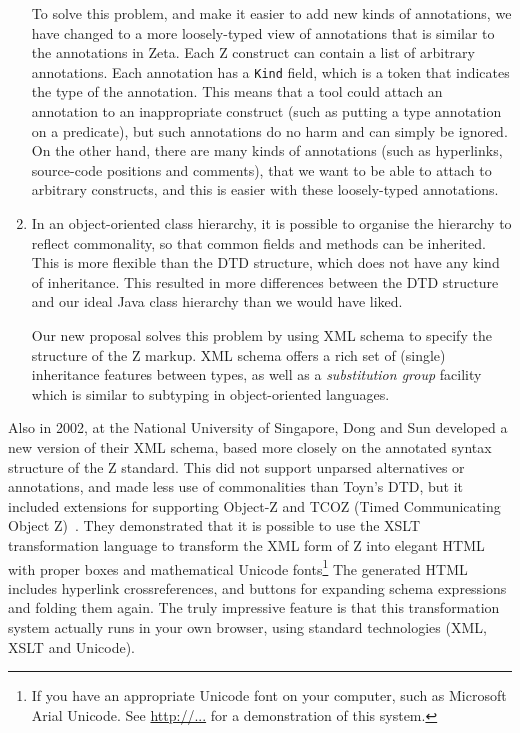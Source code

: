 \documentclass{llncs}  %
\begin{document}
\begin{enumerate}
  To solve this problem, and make it easier to add new kinds of
  annotations, we have changed to a more loosely-typed view of annotations
  that is similar to the annotations in Zeta.  Each Z construct can contain
  a list of arbitrary annotations.  Each annotation has a \verb!Kind!
  field, which is a token that indicates the type of the annotation.  This
  means that a tool could attach an annotation to an inappropriate
  construct (such as putting a type annotation on a predicate), but such
  annotations do no harm and can simply be ignored.  On the other hand,
  there are many kinds of annotations (such as hyperlinks, source-code
  positions and comments), that we want to be able to attach to arbitrary
  constructs, and this is easier with these loosely-typed annotations.
  
\item In an object-oriented class hierarchy, it is possible to organise
  the hierarchy to reflect commonality, so that common fields and methods
  can be inherited.  This is more flexible than the DTD structure, which
  does not have any kind of inheritance.  This resulted in more differences
  between the DTD structure and our ideal Java class hierarchy than we
  would have liked. 

  Our new proposal solves this problem by using XML schema to specify the
  structure of the Z markup.  XML schema offers a rich set of (single)
  inheritance features between types, as well as a \emph{substitution
  group} facility which is similar to subtyping in object-oriented
  languages.  
\end{enumerate}


Also in 2002, at the National University of Singapore, Dong and Sun
developed a new version of their XML schema, based more closely on
the annotated syntax structure of the Z standard.  This did not
support unparsed alternatives or annotations, and made less use of
commonalities than Toyn's DTD, but it included extensions 
for supporting Object-Z and TCOZ (Timed Communicating Object Z)~\cite{???}.
They demonstrated that it is possible to use the XSLT transformation
language to transform the XML form of Z into elegant HTML with proper boxes
and mathematical Unicode fonts\footnote{If you have an appropriate Unicode
  font on your computer, such as Microsoft Arial Unicode.  See
  \url{http://...} for a demonstration of this system.}
The generated HTML includes hyperlink crossreferences, and buttons for
expanding schema expressions and folding them again.  The truly impressive
feature is that this transformation system actually runs in your own
browser, using standard technologies (XML, XSLT and Unicode).
\end{document}
